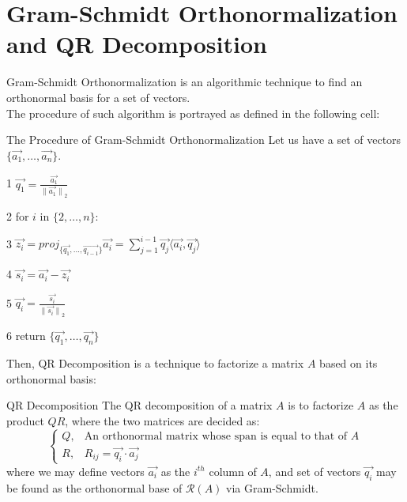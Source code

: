 \section{Gram-Schmidt Orthonormalization and QR Decomposition}
Gram-Schmidt Orthonormalization is an algorithmic technique to find an orthonormal basis for a set of vectors. \\
The procedure of such algorithm is portrayed as defined in the following cell:
\begin{ln-define}{The Procedure of Gram-Schmidt Orthonormalization}{}
    Let us have a set of vectors $\{\vec{a_1}, \dots, \vec{a_n}\}$.
    \begin{bindenum}
        \item[1] $\vec{q_1} = \frac{\vec{a_1}}{{\lVert \vec{a_1} \rVert}_2}$
        \item[2] for $i$ in $\{2, \dots, n\}$:
        \item[3] \hspace{0.6cm} $\vec{z_i} = {proj}_{\{\vec{q_1}, \dots, \vec{q_{i - 1}}\}} \vec{a_i} = \sum_{j = 1}^{i - 1} \vec{q_j} \langle \vec{a_i}, \vec{q_j} \rangle$
        \item[4] \hspace{0.6cm} $\vec{s_i} = \vec{a_i} - \vec{z_i}$
        \item[5] \hspace{0.6cm} $\vec{q_i} = \frac{\vec{s_i}}{{\lVert \vec{s_i} \rVert}_2}$
        \item[6] return $\{\vec{q_1}, \dots, \vec{q_n}\}$
    \end{bindenum}
\end{ln-define}
\par
Then, QR Decomposition is a technique to factorize a matrix $A$ based on its orthonormal basis:
\begin{ln-define}{QR Decomposition}{}
    The QR decomposition of a matrix $A$ is to factorize $A$ as the product $QR$, where the two matrices are decided as:
    \[
        \begin{cases}
            Q, &\text{An orthonormal matrix whose span is equal to that of $A$} \\
            R, &R_{ij} = \vec{q_i} \cdot \vec{a_j}
        \end{cases}
    \]
    where we may define vectors $\vec{a_i}$ as the $i^{th}$ column of $A$, and set of vectors $\vec{q_i}$ may be found as the orthonormal base of $\mathcal{R}(A)$ via Gram-Schmidt.
\end{ln-define}
